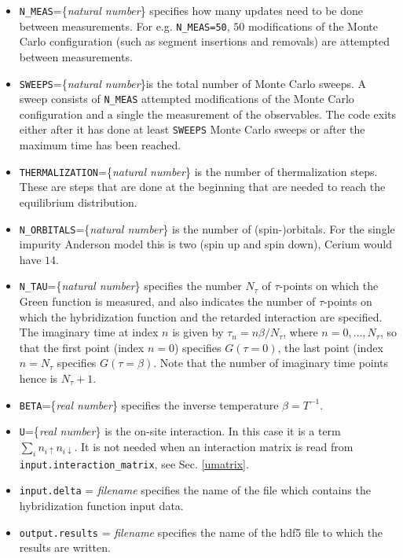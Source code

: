 \documentclass[aps,prb,floatfix,superscriptaddress,twocolumn,notitlepage]{revtex4-1}
\begin{document}
\begin{itemize}
\item \verb#N_MEAS#=\{\emph{natural number}\} specifies how many updates need to be done between measurements. For e.g. \verb#N_MEAS=50#, $50$ modifications of the Monte Carlo configuration (such as segment insertions and removals) are attempted between measurements.
\item \verb#SWEEPS#=\{\emph{natural number}\}is the total number of Monte Carlo sweeps. A sweep consists of \verb#N_MEAS# attempted modifications of the Monte Carlo configuration and a single the measurement of the observables. The code exits either after it has done at least \verb#SWEEPS# Monte Carlo sweeps or after the maximum time has been reached.
\item \verb#THERMALIZATION#=\{\emph{natural number}\} is the number of thermalization steps. These are steps that are done at the beginning that are needed to reach the equilibrium distribution.
\item \verb#N_ORBITALS#=\{\emph{natural number}\} is the number of (spin-)orbitals. For the single impurity Anderson model this is two (spin up and spin down), Cerium would have $14$.
\item \verb#N_TAU#=\{\emph{natural number}\} specifies the number $N_{\tau}$ of $\tau$-points on which the Green function is measured, and also indicates the number of $\tau$-points on which the hybridization function and the retarded interaction are specified. The imaginary time at index $n$ is given by $\tau_{n}=n\beta/N_{\tau}$, where $n=0,\ldots,N_{\tau}$, so that the first point (index $n=0$) specifies $G(\tau=0)$, the last point (index $n=N_{\tau}$ specifies $G(\tau=\beta)$. Note that the number of imaginary time points hence is $N_{\tau}+1$.
\item \verb#BETA#=\{\emph{real number}\} specifies the inverse temperature $\beta=T^{-1}$.
\item \verb#U#=\{\emph{real number}\} is the on-site interaction. In this case it is a term $\sum_i n_{i\uparrow}n_{i\downarrow}$. It is not needed when an interaction matrix is read from \verb#input.interaction_matrix#, see Sec. \ref{umatrix}.
\item \verb#input.delta# = \emph{filename} specifies the name of the file which contains the hybridization function input data.
\item \verb#output.results# = \emph{filename} specifies the name of the hdf5 file to which the results are written.
\end{itemize}
\end{document}
